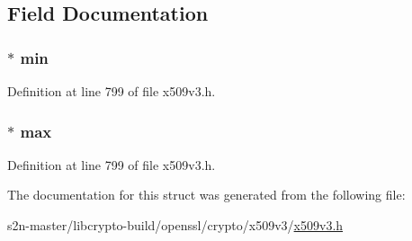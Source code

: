 \subsection{Field Documentation}
\subsubsection[{\texorpdfstring{min}{min}}]{ $\ast$ min}\hypertarget{struct_i_p_address_range__st_ac7199047cef080270fd8e6b88cb47856}{}\label{struct_i_p_address_range__st_ac7199047cef080270fd8e6b88cb47856}


Definition at line 799 of file x509v3.\+h.

\subsubsection[{\texorpdfstring{max}{max}}]{ $\ast$ max}\hypertarget{struct_i_p_address_range__st_ada1c031150f9202aa2ab31ba3d20b528}{}\label{struct_i_p_address_range__st_ada1c031150f9202aa2ab31ba3d20b528}


Definition at line 799 of file x509v3.\+h.



The documentation for this struct was generated from the following file\+:\begin{DoxyCompactItemize}
\item 
s2n-\/master/libcrypto-\/build/openssl/crypto/x509v3/\hyperlink{crypto_2x509v3_2x509v3_8h}{x509v3.\+h}\end{DoxyCompactItemize}

